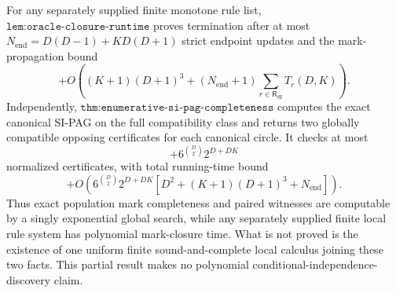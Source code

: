 For any separately supplied finite monotone rule list, \(\texttt{lem:oracle-closure-runtime}\) proves termination after at most \(N_{\mathrm{end}}=D(D-1)+KD(D+1)\) strict endpoint updates and the mark-propagation bound
\[
+O\!\left((K+1)(D+1)^3+(N_{\mathrm{end}}+1)\sum_{r\in\mathsf R_{\mathrm{SI}}}T_r(D,K)\right).
\]
Independently, \(\texttt{thm:enumerative-si-pag-completeness}\) computes the exact canonical SI-PAG on the full compatibility class and returns two globally compatible opposing certificates for each canonical circle. It checks at most
\[
+6^{\binom D2}2^{D+DK}
\]
normalized certificates, with total running-time bound
\[
+O\!\left(6^{\binom D2}2^{D+DK}\left[D^2+(K+1)(D+1)^3+N_{\mathrm{end}}\right]\right).
\]
Thus exact population mark completeness and paired witnesses are computable by a singly exponential global search, while any separately supplied finite local rule system has polynomial mark-closure time. What is not proved is the existence of one uniform finite sound-and-complete local calculus joining these two facts. This partial result makes no polynomial conditional-independence-discovery claim.